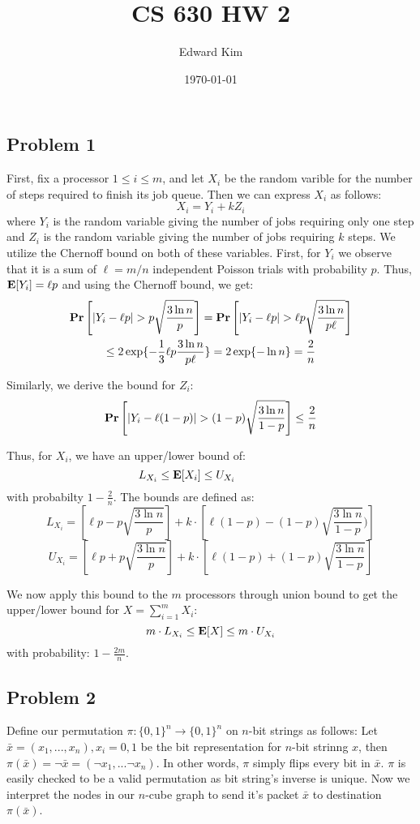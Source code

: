 \documentclass[12pt]{article}%
\begin{document}
\title{CS 630 HW 2}
\author{Edward Kim}
\date{\today}
\maketitle

\subsection*{Problem 1}
First, fix a processor $1 \leq i \leq m$, and let $X_i$ be the random varible for the number of steps required to finish its job queue. Then we can express $X_i$ as follows:
$$X_i = Y_i + kZ_i $$ where $Y_i$ is the random variable giving the number of jobs requiring only one step and $Z_i$ is the random variable giving the number of jobs requiring $k$ steps. We utilize the Chernoff bound on both of these variables. First, for $Y_i$ we observe that it is a sum of $\ell = m/n$ independent Poisson trials with probability $p$. Thus, ${\bf E}[Y_i] = \ell p$ and using the Chernoff bound, we get:
\begin{gather*}
{\bf Pr}\left[|Y_i - \ell p| >  p \sqrt{\frac{3\ln{n}}{p}}\right] =
{\bf Pr}\left[|Y_i - \ell p| >  \ell p \sqrt{\frac{3\ln{n}}{p\ell}}\right] \\
\leq 2\exp\{-\frac{1}{3}{\ell}p\frac{3\ln{n}}{p\ell}\}= 2\exp\{-\ln{n}\} = \frac{2}{n}
\end{gather*}

Similarly, we derive the bound for $Z_i$:
$${\bf Pr}\left[|Y_i - \ell(1-p)| >  (1-p) \sqrt{\frac{3\ln{n}}{1-p}}\right] \leq \frac{2}{n}$$

Thus, for $X_i$, we have an upper/lower bound of:
\begin{equation*}
 \hspace*{-1.5cm} L_{X_i} \leq {\bf E}[X_i] \leq U_{X_i}
\end{equation*}
with probabilty $1 - \frac{2}{n}$. The bounds are defined as:
$$L_{X_i} = \left[\ell p - p \sqrt{\frac{3\ln{n}}{p}}\right] + k \cdot\left[\ell(1-p) - (1-p) \sqrt{\frac{3\ln{n}}{1-p}})\right] $$
$$U_{X_i} =  \left[\ell p + p \sqrt{\frac{3\ln{n}}{p}}\right] + k \cdot\left[\ell(1-p) +(1-p) \sqrt{\frac{3\ln{n}}{1-p}}\right]$$
 \newline

We now apply this bound to the $m$ processors through union bound to get the upper/lower bound for $X = \sum_{i=1}^m X_i$:
$$ m \cdot L_{X_i} \leq {\bf E}[X] \leq m\cdot U_{X_i}$$ with probability:
$1 - \frac{2m}{n}$.

\subsection*{Problem 2}
Define our permutation $\pi:\{0,1\}^n \rightarrow \{0,1\}^n$ on $n$-bit strings as follows: Let ${\bar x} = (x_1,...,x_n), x_i = 0,1$ be the bit representation for $n$-bit strinng $x$, then $\pi({\bar x}) = \neg {\bar x } = (\neg x_1,...\neg x_n)$. In other words, $\pi$ simply flips every bit in ${\bar x}$. $\pi$ is easily checked to be a valid permutation as bit string's inverse is unique. Now we interpret the nodes in our $n$-cube graph to send it's packet ${\bar x}$ to destination $\pi({\bar x})$. \newline
\end{document}
